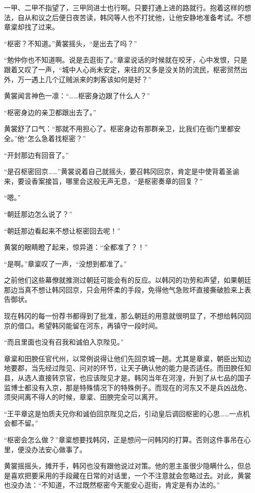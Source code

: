 一甲、二甲不指望了，三甲同进士也行啊。只要打通上进的路就行。抱着这样的想法，自从和议之后便日夜苦读，韩冈等人也不打扰他，让他安静地准备考试。不想章楶却找了过来。

“枢密？不知道。”黄裳摇头，“是出去了吗？”

“勉仲你也不知道啊。说是去逛街了。”章楶说话的时候就在咬牙，心中发恨，只是跟着又叹了一声，“城中人心尚未安定，来往的又多是没关防的流民，枢密贸然出外，万一遇上几个辽贼派来的刺客该如何是好？”

黄裳闻言神色一凛：“……枢密身边跟了什么人？”

“枢密身边的亲卫都跟出去了。”

黄裳舒了口气：“那就不用担心了。枢密身边有那群亲卫，比我们在衙门里都安全。”他“怎么急着找枢密？”

“开封那边有回音了。”

“是召枢密回京……”黄裳说着自己就摇头，要召韩冈回京，肯定是中使背着圣谕来，要设香案接旨，哪里会这般无声无息，“是枢密奏章的回复？”

“嗯。”

“朝廷那边怎么说了？”

“朝廷那边看起来不想让枢密回去呢！”

黄裳的眼睛瞪了起来，惊异道：“全都准了？！”

“是啊。”章楶叹了一声，“没想到都准了。”

之前他们这些幕僚就推测过朝廷可能会有的反应。以韩冈的功劳和声望，如果朝廷那边当真不想让韩冈回京，只会用怀柔的手段，免得他气急败坏直接撕破脸来上表告御状。

现在韩冈的每一份荐书都得到了批准，那么朝廷的用意就很明显了，不想给韩冈回京的借口。希望韩冈能留在河东，再镇守一段时间。

“而且里面也没有召我和诚伯入京陛见。”

章楶和田腴任官代州，以常例说得让他们先回京城一趟。尤其是章楶，朝臣出知边地要郡，当先经过陛见、问对的环节，让天子确认他的能力是否适任。而田腴任知县，从选人直接转京官，也应该陛见才是。韩冈当年在河湟，升到了从七品的国子监博士都没有入京，那是特殊情况下的特殊例子。而现在的河东又不是兵凶战危、须臾间离不得人的时候，章楶、田腴完全可以离开。

“王平章这是怕质夫兄你和诚伯回京陛见之后，引动皇后调回枢密的心思……一点机会都不留。”

“枢密会怎么做？”章楶想要找韩冈，正是想问一问韩冈的打算。否则这件事吊在心里，便没办法安心做事了。

黄裳摇摇头，摊开手，韩冈也没有跟他说过对策。他的恩主虽很少隐瞒什么，但总是喜欢把要采用的手段藏在日常的对话里，一个不注意就会忽略过去。对此，黄裳也没办法：“不知道，不过既然枢密今天能安心逛街，肯定是有办法的。”


